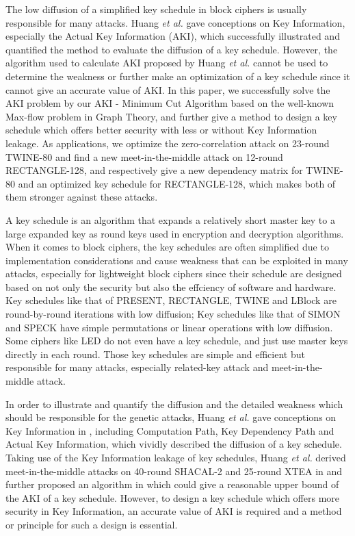 \begin{bigabstract}
The low diffusion of a simplified key schedule in block ciphers is usually responsible for many attacks.
    Huang \emph{et al.} gave conceptions on Key Information, especially the Actual Key Information (AKI), which successfully illustrated and quantified the method to evaluate the diffusion of a key schedule.
    However, the algorithm used to calculate AKI proposed by Huang \emph{et al.} cannot be used to determine the weakness or further make an optimization of a key schedule since it cannot give an accurate value of AKI.
    In this paper, we successfully solve the AKI problem by our AKI - Minimum Cut Algorithm based on the well-known Max-flow problem in Graph Theory,
    and further give a method to design a key schedule which offers better security with less or without Key Information leakage.
    As applications, we optimize the zero-correlation attack on 23-round TWINE-80 and find a new meet-in-the-middle attack on 12-round RECTANGLE-128,
    and respectively give a new dependency matrix for TWINE-80 and an optimized key schedule for RECTANGLE-128, which makes both of them stronger against these attacks.

A key schedule is an algorithm that expands a relatively short master key to a large expanded key as round keys used in encryption and decryption algorithms.
When it comes to block ciphers, the key schedules are often simplified due to implementation considerations and cause weakness that can be exploited in many attacks, especially for lightweight block ciphers since their schedule are designed based on not only the security but also the effciency of software and hardware.
Key schedules like that of PRESENT, RECTANGLE, TWINE and LBlock are round-by-round iterations with low diffusion;
Key schedules like that of SIMON and SPECK have simple permutations or linear operations with low diffusion.
Some ciphers like LED do not even have a key schedule, and just use master keys directly in each round.
Those key schedules are simple and efficient but responsible for many attacks, especially related-key attack and meet-in-the-middle attack.

In order to illustrate and quantify the diffusion and the detailed weakness which should be responsible for the genetic attacks, Huang \emph{et al.} gave conceptions on Key Information in , including Computation Path, Key Dependency Path and Actual Key Information, which vividly described the diffusion of a key schedule. 
Taking use of the Key Information leakage of key schedules, Huang \emph{et al.} derived meet-in-the-middle attacks on 40-round SHACAL-2 and 25-round XTEA in  and further proposed an algorithm in  which could give a reasonable upper bound of the AKI of a key schedule.
However, to design a key schedule which offers more security in Key Information, an accurate value of AKI is required and a method or principle for such a design is essential.


\end{bigabstract}

